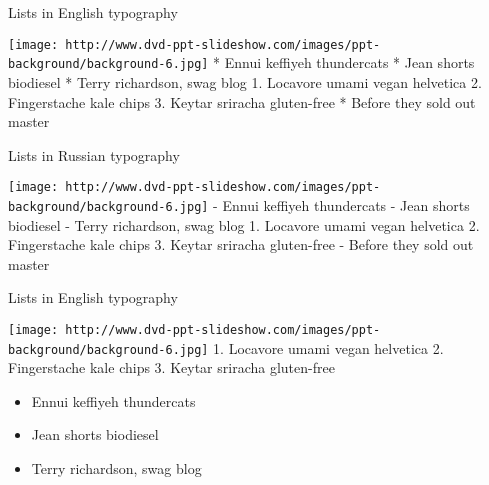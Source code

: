 \documentclass[ignorenonframetext,]{beamer}
\makeatletter
\def\ScaleIfNeeded{%
  \ifdim\Gin@nat@width>\linewidth
    \linewidth
  \else
    \Gin@nat@width
  \fi
}
\let\Oldincludegraphics\includegraphics
\renewcommand{\includegraphics}[2][]{\Oldincludegraphics[width=\ScaleIfNeeded]{#2}}
\makeatother
\begin{document}
\begin{frame}{Lists in English typography}

\texttt{[image: http://www.dvd-ppt-slideshow.com/images/ppt-background/background-6.jpg]}
* Ennui keffiyeh thundercats * Jean shorts biodiesel * Terry richardson,
swag blog 1. Locavore umami vegan helvetica 2. Fingerstache kale chips
3. Keytar sriracha gluten-free * Before they sold out master

\end{frame}

\begin{frame}

\begin{block}{Lists in Russian typography}

\texttt{[image: http://www.dvd-ppt-slideshow.com/images/ppt-background/background-6.jpg]}
- Ennui keffiyeh thundercats - Jean shorts biodiesel - Terry richardson,
swag blog 1. Locavore umami vegan helvetica 2. Fingerstache kale chips
3. Keytar sriracha gluten-free - Before they sold out master

\end{block}

\end{frame}

\begin{frame}

\begin{block}{Lists in English typography}

\texttt{[image: http://www.dvd-ppt-slideshow.com/images/ppt-background/background-6.jpg]}
1. Locavore umami vegan helvetica 2. Fingerstache kale chips 3. Keytar
sriracha gluten-free

\begin{itemize}
\itemsep1pt\parskip0pt
\item
  Ennui keffiyeh thundercats
\item
  Jean shorts biodiesel
\item
  Terry richardson, swag blog
\end{itemize}

\end{block}

\end{frame}
\end{document}
